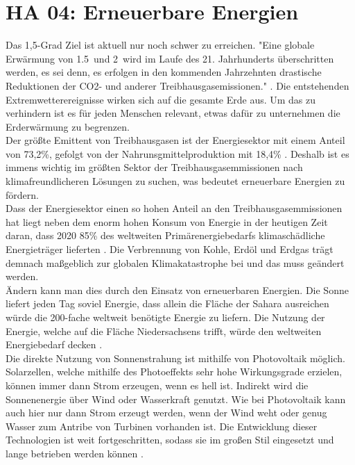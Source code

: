\section{HA 04: Erneuerbare Energien} \label{ha04}
  Das 1,5-Grad Ziel ist aktuell nur noch schwer zu erreichen. "Eine globale Erwärmung von 1.5\textcelsius\ und 2\textcelsius\ wird im Laufe des 21. Jahrhunderts überschritten werden, es sei denn, es erfolgen in den kommenden Jahrzehnten drastische Reduktionen der CO2- und anderer Treibhausgasemissionen." \cite{ipcc_climate_2021}. Die entstehenden Extremwetterereignisse wirken sich auf die gesamte Erde aus. Um das zu verhindern ist es für jeden Menschen relevant, etwas dafür zu unternehmen die Erderwärmung zu begrenzen.\\
  Der größte Emittent von Treibhausgasen ist der Energiesektor mit einem Anteil von 73,2\%, gefolgt von der Nahrunsgmittelproduktion mit 18,4\% \cite{ritchie_co2_2020}. Deshalb ist es immens wichtig im größten Sektor der Treibhausgasemmissionen nach klimafreundlicheren Lösungen zu suchen, was bedeutet erneuerbare Energien zu fördern.\\
  Dass der Energiesektor einen so hohen Anteil an den Treibhausgasemmissionen hat liegt neben dem enorm hohen Konsum von Energie in der heutigen Zeit daran, dass 2020 85\% des weltweiten Primärenergiebedarfs klimaschädliche Energieträger lieferten \cite{quaschning_regenerative_2019}. Die Verbrennung von Kohle, Erdöl und Erdgas trägt demnach maßgeblich zur globalen Klimakatastrophe bei und das muss geändert werden.\\
  Ändern kann man dies durch den Einsatz von erneuerbaren Energien. Die Sonne liefert jeden Tag soviel Energie, dass allein die Fläche der Sahara ausreichen würde die 200-fache weltweit benötigte Energie zu liefern. Die Nutzung der Energie, welche auf die Fläche Niedersachsens trifft, würde den weltweiten Energiebedarf decken \cite{quaschning_regenerative_2019}.\\
  Die direkte Nutzung von Sonnenstrahung ist mithilfe von Photovoltaik möglich. Solarzellen, welche mithilfe des Photoeffekts sehr hohe Wirkungsgrade erzielen, können immer dann Strom erzeugen, wenn es hell ist. Indirekt wird die Sonnenenergie über Wind oder Wasserkraft genutzt. Wie bei Photovoltaik kann auch hier nur dann Strom erzeugt werden, wenn der Wind weht oder genug Wasser zum Antribe von Turbinen vorhanden ist. Die Entwicklung dieser Technologien ist weit fortgeschritten, sodass sie im großen Stil eingesetzt und lange betrieben werden können \cite{quaschning_regenerative_2019}.\\

